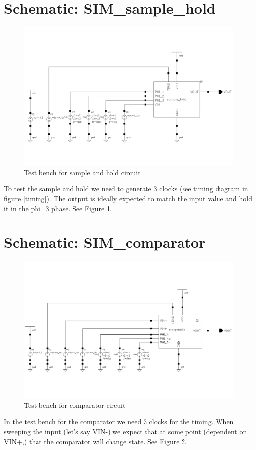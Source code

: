 \documentclass[english, a4paper,11pt]{article}
\begin{document}
\section*{Schematic: SIM\_sample\_hold}
\begin{figure}[!ht]
 \centering
   \includegraphics[width=\textwidth]{img/SIM_sample_hold.png}
   \caption{Test bench for sample and hold circuit}
   \label{sim:sh}
\end{figure}
To test the sample and hold we need to generate 3 clocks (see timing diagram in figure \ref{timing}). 
The output is ideally expected to match the input value and hold it in the phi\_3 phase.
See Figure \ref{sim:sh}.

\section*{Schematic: SIM\_comparator}
\begin{figure}[!ht]
 \centering
   \includegraphics[width=\textwidth]{img/SIM_comparator.png}
   \caption{Test bench for comparator circuit}
   \label{sim:comparator}
\end{figure}
In the test bench for the comparator we need 3 clocks for the timing. 
When sweeping the input (let's say VIN-) we expect that at some point (dependent on VIN+,) that the comparator will change state. 
See Figure \ref{sim:comparator}.
\end{document}

